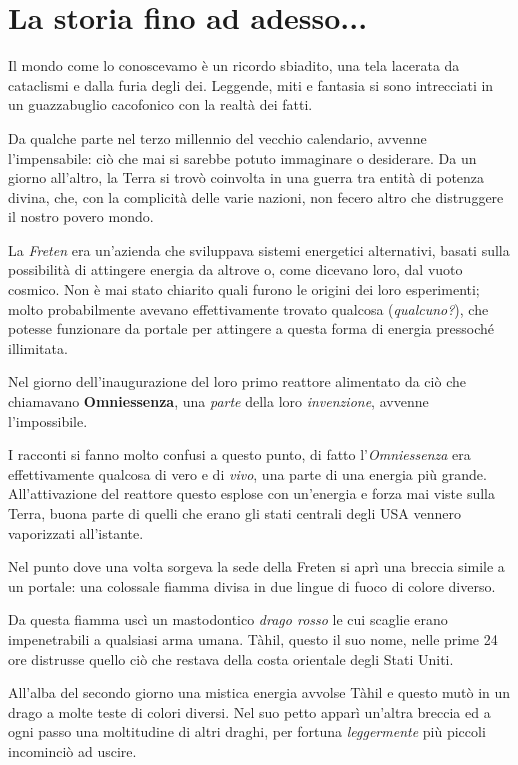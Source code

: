 \section{La storia fino ad adesso...}

\begin{multicols}{2}

Il mondo come lo conoscevamo è un ricordo sbiadito, una tela lacerata da cataclismi e dalla furia degli dei. Leggende, miti e fantasia si sono intrecciati in un guazzabuglio cacofonico con la realtà dei fatti.

Da qualche parte nel terzo millennio del vecchio calendario, avvenne l’impensabile: ciò che mai si sarebbe potuto immaginare o desiderare. Da un giorno all’altro, la Terra si trovò coinvolta in una guerra tra entità di potenza divina, che, con la complicità delle varie nazioni, non fecero altro che distruggere il nostro povero mondo.

La \emph{Freten} era un'azienda che sviluppava sistemi energetici alternativi, basati sulla possibilità di attingere energia da altrove o, come dicevano loro, dal vuoto cosmico.
Non è mai stato chiarito quali furono le origini dei loro esperimenti; molto probabilmente avevano effettivamente trovato qualcosa (\emph{qualcuno?}), che potesse funzionare da portale per attingere a questa forma di energia pressoché illimitata.

Nel giorno dell'inaugurazione del loro primo reattore alimentato da ciò che chiamavano  \textbf{Omniessenza}, una \emph{parte} della loro \emph{invenzione}, avvenne l'impossibile.

I racconti si fanno molto confusi a questo punto, di fatto l'\emph{Omniessenza} era effettivamente qualcosa di vero e di \emph{vivo}, una parte di una energia più grande. All'attivazione del reattore questo esplose con un'energia e forza mai viste sulla Terra, buona parte di quelli che erano gli stati centrali degli USA vennero vaporizzati all'istante.

Nel punto dove una volta sorgeva la sede della Freten si aprì una breccia simile a un portale: una colossale fiamma divisa in due lingue di fuoco di colore diverso.

Da questa fiamma uscì un mastodontico \emph{drago rosso} le cui scaglie erano impenetrabili a qualsiasi arma umana. Tàhil, questo il suo nome, nelle prime 24 ore distrusse quello ciò che restava della costa orientale degli Stati Uniti.

All'alba del secondo giorno una mistica energia avvolse Tàhil e questo mutò in un drago a molte teste di colori diversi. Nel suo petto apparì un'altra breccia ed a ogni passo una moltitudine di altri draghi, per fortuna \emph{leggermente} più piccoli incominciò ad uscire.


\end{multicols}
